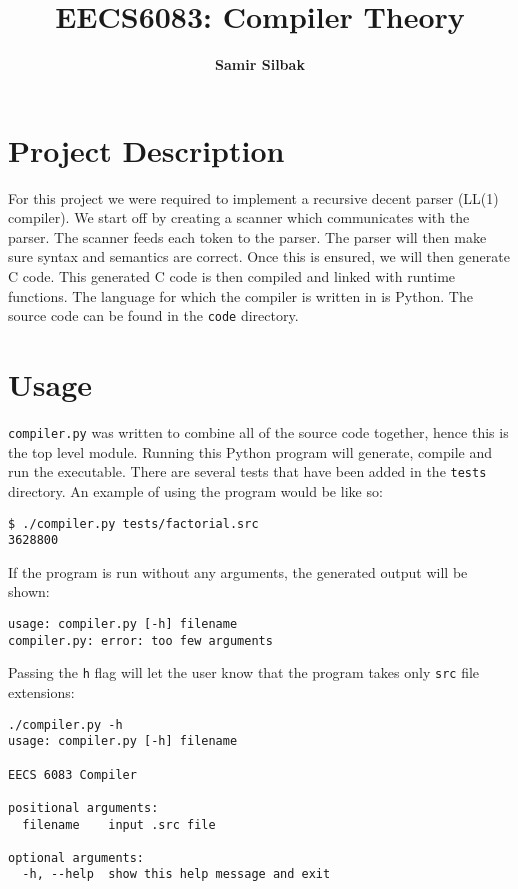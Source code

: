 \documentclass[10pt]{article}
\title{
    \vspace{2in}
    \textmd{\textbf{EECS6083: Compiler Theory}}\\
    \vspace{4in}
}
\author{\textbf{Samir Silbak}}
\begin{document}
\maketitle
\newpage
\section{Project Description}
For this project we were required to implement a recursive decent parser (LL(1)
compiler). We start off by creating a scanner which communicates with the
parser. The scanner feeds each token to the parser. The parser will then make
sure syntax and semantics are correct. Once this is ensured, we will then
generate C code. This generated C code is then compiled and linked with
runtime functions. The language for which the compiler is written in is Python.
The source code can be found in the \texttt{code} directory.

\section{Usage}
\texttt{compiler.py} was written to combine all of the source code together,
hence this is the top level module. Running this Python program will generate,
compile and run the executable. There are several tests that have been added in
the \texttt{tests} directory. An example of using the program would be like so:

\begin{verbatim}
$ ./compiler.py tests/factorial.src
3628800
\end{verbatim}

If the program is run without any arguments, the generated output will be
shown:

\begin{verbatim}
usage: compiler.py [-h] filename
compiler.py: error: too few arguments
\end{verbatim}

Passing the \texttt{h} flag will let the user know that the program takes only
\texttt{src} file extensions:

\begin{verbatim}
./compiler.py -h
usage: compiler.py [-h] filename

EECS 6083 Compiler

positional arguments:
  filename    input .src file

optional arguments:
  -h, --help  show this help message and exit
\end{verbatim}
\end{document}
